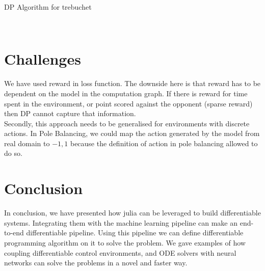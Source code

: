 \documentclass{juliacon}
\begin{document}
\begin{algorithm}[!htb]
    \caption{DP Algorithm for trebuchet}
    \label{alg:DiffRLTrebuchet}
    \SetAlgoLined
    \
\end{algorithm}


\section{Challenges}
We have used reward in loss function. The downside here is that reward has to be dependent on the model in the computation graph. If there is reward for time spent in the environment, or point scored against the opponent (sparse reward) then DP cannot capture that information. \\
Secondly, this approach needs to be generalised for environments with discrete actions. In Pole Balancing, we could map the action generated by the model from real domain to ${-1, 1}$ because the definition of action in pole balancing allowed to do so.

\section{Conclusion}
In conclusion, we have presented how julia can be leveraged to build differentiable systems. Integrating them with the machine learning pipeline can make an end-to-end differentiable pipeline. Using this pipeline we can define differentiable programming algorithm on it to solve the problem. We gave examples of how coupling differentiable control environments, and ODE solvers with neural networks can solve the problems in a novel and faster way.



\end{document}
